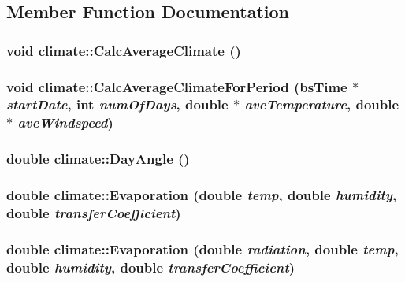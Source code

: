 \subsection{Member Function Documentation}
\hypertarget{classclimate_a959c6049cbb0c3d517966ef11f0cf0bc}{
\subsubsection[{CalcAverageClimate}]{\setlength{\rightskip}{0pt plus 5cm}void climate::CalcAverageClimate ()}}
\label{classclimate_a959c6049cbb0c3d517966ef11f0cf0bc}
\hypertarget{classclimate_a315fd3212ace7b479f8abf1b983306df}{
\subsubsection[{CalcAverageClimateForPeriod}]{\setlength{\rightskip}{0pt plus 5cm}void climate::CalcAverageClimateForPeriod ({\bf bsTime} $\ast$ {\em startDate}, \/  int {\em numOfDays}, \/  double $\ast$ {\em aveTemperature}, \/  double $\ast$ {\em aveWindspeed})}}
\label{classclimate_a315fd3212ace7b479f8abf1b983306df}
\hypertarget{classclimate_a8c93caa7c165cb2956fccdb29056ebda}{
\subsubsection[{DayAngle}]{\setlength{\rightskip}{0pt plus 5cm}double climate::DayAngle ()}}
\label{classclimate_a8c93caa7c165cb2956fccdb29056ebda}
\hypertarget{classclimate_a4efc44cd76e875cd44151c54814a3dff}{
\subsubsection[{Evaporation}]{\setlength{\rightskip}{0pt plus 5cm}double climate::Evaporation (double {\em temp}, \/  double {\em humidity}, \/  double {\em transferCoefficient})}}
\label{classclimate_a4efc44cd76e875cd44151c54814a3dff}
\hypertarget{classclimate_adf16cf971faa070a3a1f52cca3f25686}{
\subsubsection[{Evaporation}]{\setlength{\rightskip}{0pt plus 5cm}double climate::Evaporation (double {\em radiation}, \/  double {\em temp}, \/  double {\em humidity}, \/  double {\em transferCoefficient})}}
